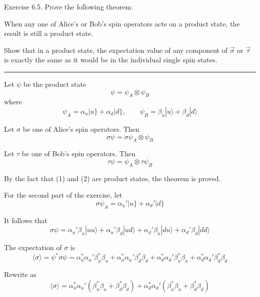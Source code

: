 \documentclass[12pt]{article}
\begin{document}
Exercise 6.5.
Prove the following theorem:

\bigskip
When any one of Alice's or Bob's spin operators acts on a
product state, the result is still a product state.

\bigskip
Show that in a product state, the expectation value of any
component of $\vec\sigma$ or $\vec\tau$ is exactly the same as it
would be in the individual single spin states.

\bigskip
\hrule

\bigskip
Let $\psi$ be the product state
\begin{equation*}
\psi=\psi_A\otimes\psi_B
\end{equation*}
where
\begin{equation*}
\psi_A=\alpha_u|u\}+\alpha_d|d\},
\qquad
\psi_B=\beta_u|u\rangle+\beta_d|d\rangle
\end{equation*}

Let $\sigma$ be one of Alice's spin operators.
Then
\begin{equation*}
\sigma\psi=\sigma\psi_A\otimes\psi_B
\tag{1}
\end{equation*}

Let $\tau$ be one of Bob's spin operators.
Then
\begin{equation*}
\tau\psi=\psi_A\otimes\tau\psi_B
\tag{2}
\end{equation*}

By the fact that (1) and (2) are product states, the theorem is proved.

\bigskip
For the second part of the exercise, let
\begin{equation*}
\sigma\psi_A=\alpha_u'|u\}+\alpha_d'|d\}
\end{equation*}

It follows that
\begin{equation*}
\sigma\psi=\alpha_u'\beta_u|uu\rangle+\alpha_u'\beta_d|ud\rangle+\alpha_d'\beta_u|du\rangle+\alpha_d'\beta_d|dd\rangle
\end{equation*}

The expectation of $\sigma$ is
\begin{equation*}
\langle\sigma\rangle=\psi^*\sigma\psi
=\alpha_u^*\alpha_u'\beta_u^*\beta_u+\alpha_u^*\alpha_u'\beta_d^*\beta_d
+\alpha_d^*\alpha_d'\beta_u^*\beta_u+\alpha_d^*\alpha_d'\beta_d^*\beta_d
\end{equation*}

Rewrite as
\begin{equation*}
\langle\sigma\rangle=\alpha_u^*\alpha_u'(\beta_u^*\beta_u+\beta_d^*\beta_d)
+\alpha_d^*\alpha_d'(\beta_u^*\beta_u+\beta_d^*\beta_d)
\end{equation*}
\end{document}
